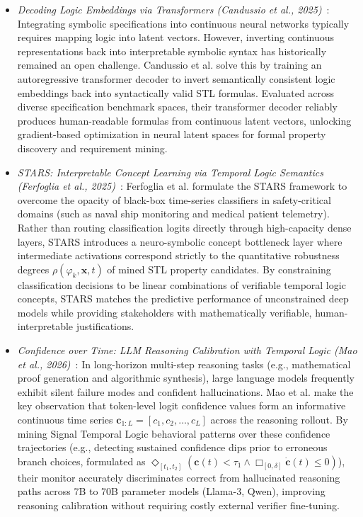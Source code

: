 \begin{itemize}[leftmargin=*]
    \item \emph{Decoding Logic Embeddings via Transformers (Candussio et al., 2025)}~\cite{candussio2025decoding}: Integrating symbolic specifications into continuous neural networks typically requires mapping logic into latent vectors. However, inverting continuous representations back into interpretable symbolic syntax has historically remained an open challenge. Candussio et al. solve this by training an autoregressive transformer decoder to invert semantically consistent logic embeddings back into syntactically valid STL formulas. Evaluated across diverse specification benchmark spaces, their transformer decoder reliably produces human-readable formulas from continuous latent vectors, unlocking gradient-based optimization in neural latent spaces for formal property discovery and requirement mining.
    \item \emph{STARS: Interpretable Concept Learning via Temporal Logic Semantics (Ferfoglia et al., 2025)}~\cite{ferfoglia2025stars}: Ferfoglia et al. formulate the STARS framework to overcome the opacity of black-box time-series classifiers in safety-critical domains (such as naval ship monitoring and medical patient telemetry). Rather than routing classification logits directly through high-capacity dense layers, STARS introduces a neuro-symbolic concept bottleneck layer where intermediate activations correspond strictly to the quantitative robustness degrees $\rho(\varphi_k, \mathbf{x}, t)$ of mined STL property candidates. By constraining classification decisions to be linear combinations of verifiable temporal logic concepts, STARS matches the predictive performance of unconstrained deep models while providing stakeholders with mathematically verifiable, human-interpretable justifications.
    \item \emph{Confidence over Time: LLM Reasoning Calibration with Temporal Logic (Mao et al., 2026)}~\cite{mao2026confidence}: In long-horizon multi-step reasoning tasks (e.g., mathematical proof generation and algorithmic synthesis), large language models frequently exhibit silent failure modes and confident hallucinations. Mao et al. make the key observation that token-level logit confidence values form an informative continuous time series $\mathbf{c}_{1:L} = [c_1, c_2, \dots, c_L]$ across the reasoning rollout. By mining Signal Temporal Logic behavioral patterns over these confidence trajectories (e.g., detecting sustained confidence dips prior to erroneous branch choices, formulated as $\Diamond_{[t_1, t_2]} (\mathbf{c}(t) < \tau_1 \wedge \Box_{[0, \delta]} \dot{\mathbf{c}}(t) \le 0)$), their monitor accurately discriminates correct from hallucinated reasoning paths across 7B to 70B parameter models (Llama-3, Qwen), improving reasoning calibration without requiring costly external verifier fine-tuning.

\end{itemize}
